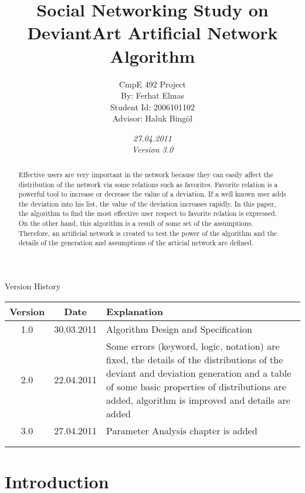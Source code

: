 \documentclass[12pt,a4paper]{report}
\title{Social Networking Study on DeviantArt Artificial Network Algorithm}
\date{\emph{27.04.2011} \\ \emph{Version 3.0} }
\author{CmpE 492 Project\\
	By: Ferhat Elmas \\
	Student Id: 2006101102\\
	Advisor: Haluk Bing\"{o}l
}
\begin{document}

\maketitle

\begin{table}[htdp]
\begin{center}
\textup{\Huge Version History}
\begin{tabular}{|c|c|p{10cm}|}
\hline
\textbf{Version} & \textbf{Date} & \textbf{Explanation} \\
\hline
1.0 & 30.03.2011 & Algorithm Design and Specification \\
\hline
2.0& 22.04.2011 & Some errors (keyword, logic, notation) are fixed, the details of the distributions of the deviant and deviation generation and a table of some basic properties of distributions are added, algorithm is improved and details are added\\
\hline
3.0& 27.04.2011& Parameter Analysis chapter is added\\
\hline
&&\\
\hline
&&\\
\hline
\end{tabular}
\end{center}
\end{table}


\begin{abstract}
	
	Effective users are very important in the network because they can easily affect the distribution of the network via some relations such as favorites. Favorite relation is a powerful tool to increase or decrease the value of a deviation. If a well known user adds the deviation into his list, the value of the deviation increases rapidly. In this paper, the algorithm to find the most effective user respect to favorite relation is expressed. \\
	
	On the other hand, this algorithm is a result of some set of the assumptions. Therefore, an artificial network is created to test the power of the algorithm and the details of the generation and assumptions of the articial network are defined.
\end{abstract}

\tableofcontents

\chapter{Introduction}
	
\end{document}
